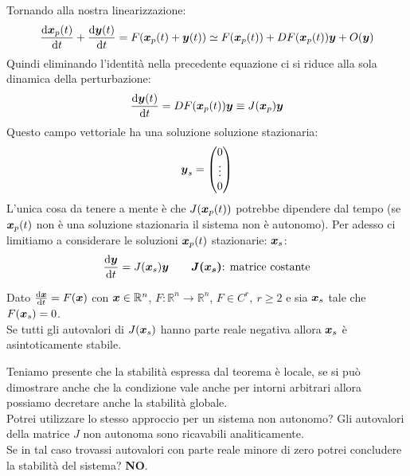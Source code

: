 \noindent
Tornando alla nostra linearizzazione:
\[
    \frac{\text{d} \boldsymbol{x}_p(t)}{\text{d} t} + \frac{\text{d} \boldsymbol{y} (t)}{\text{d} t} = 
    F(\boldsymbol{x}_p(t)+ \boldsymbol{y} (t)) \simeq 
    F(\boldsymbol{x}_p(t))+DF(\boldsymbol{x}_p(t))\boldsymbol{y}  + O(\boldsymbol{y})
\] 
Quindi eliminando l'identità nella precedente equazione ci si riduce alla sola dinamica della perturbazione:
\[
    \frac{\text{d} \boldsymbol{y} (t)}{\text{d} t} = DF(\boldsymbol{x}_p(t))\boldsymbol{y}\equiv
    J(\boldsymbol{x}_p)\boldsymbol{y}
\] 
Questo campo vettoriale ha una soluzione soluzione stazionaria: 
\[
\boldsymbol{y}_s = \begin{pmatrix} 0 \\ \vdots \\ 0 \end{pmatrix}
\] 
L'unica cosa da tenere a mente è che $J(\boldsymbol{x}_p(t))$  potrebbe dipendere dal tempo (se $\boldsymbol{x}_p(t)$ non è una soluzione stazionaria il sistema non è autonomo). Per adesso ci limitiamo a considerare le soluzioni $\boldsymbol{x}_p(t)$  stazionarie: $\boldsymbol{x}_s$:
\[
    \frac{\text{d} \boldsymbol{y}}{\text{d} t} = J(\boldsymbol{x}_s)\boldsymbol{y}  \qquad \boldsymbol{J(\boldsymbol{x}_s)}  \text{: matrice costante}
\] 
\begin{thm}
    Dato $\frac{\text{d} \boldsymbol{x}}{\text{d} t} = F(\boldsymbol{x})$ con $\boldsymbol{x}\in\mathbb{R}^n$, $F:\mathbb{R}^n \to \mathbb{R}^n$, $F \in C^r, \ r\ge 2$ e sia $\boldsymbol{x}_s$ tale che $F(\boldsymbol{x}_s)=0$.\\
    Se tutti gli autovalori di $J(\boldsymbol{x}_s)$ hanno parte reale negativa allora $\boldsymbol{x}_s$ è asintoticamente stabile.
\end{thm}
\noindent
Teniamo presente che la stabilità espressa dal teorema è locale, se si può dimostrare anche che la condizione vale anche per intorni arbitrari allora possiamo decretare anche la stabilità globale.\\
Potrei utilizzare lo stesso approccio per un sistema non autonomo? Gli autovalori della matrice $J$ non autonoma sono ricavabili analiticamente. \\
Se in tal caso trovassi autovalori con parte reale minore di zero potrei concludere la stabilità del sistema? \textbf{NO}.
